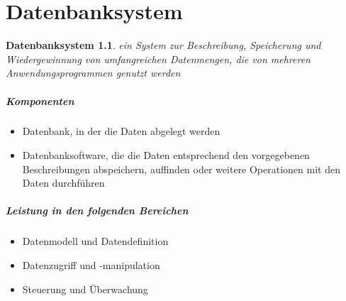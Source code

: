 \chapter{Datenbanksystem}

	\newtheorem{db-def}{Datenbanksystem}
	\begin{db-def}
		ein System zur Beschreibung, Speicherung und Wiedergewinnung von umfangreichen Datenmengen, die von mehreren Anwendungsprogrammen genutzt werden
	\end{db-def}
	
	\paragraph{Komponenten}
	\begin{itemize}
		\item Datenbank, in der die Daten abgelegt werden
		\item Datenbanksoftware, die die Daten entsprechend den vorgegebenen Beschreibungen abspeichern, auffinden oder weitere Operationen mit den Daten durchführen
	\end{itemize}
	
	\paragraph{Leistung in den folgenden Bereichen}
	\begin{itemize}
		\item Datenmodell und Datendefinition
		\item Datenzugriff und -manipulation
		\item Steuerung und Überwachung
	\end{itemize}
